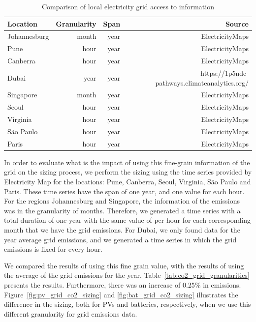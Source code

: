 \begin{table}[H]

  \caption{Comparison of local electricity grid access to information }\label{tab:grid_emissions_hist} \centering
  
  \begin{tabular}{|l|r|r|r|}
   \hline
    
  \textbf{Location} &   \textbf{Granularity} & \textbf{Span} & \textbf{Source} \\
  \hline
  Johannesburg & month & year & ElectricityMaps  \\
  \hline
  Pune  & hour & year & ElectricityMaps  \\
  \hline
  Canberra  & hour &  year & ElectricityMaps \\
  \hline
  Dubai    & year & year & https://1p5ndc-pathways.climateanalytics.org/  \\
  \hline
  Singapore & month & year & ElectricityMaps \\
  \hline     
  Seoul     & hour & year & ElectricityMaps \\
  \hline
  Virginia  &  hour & year & ElectricityMaps \\
  \hline
  São Paulo & hour & year  & ElectricityMaps \\
  \hline 
  Paris     & hour & year  & ElectricityMaps  \\  
  \hline  

\end{tabular}  
\end{table}


In order to evaluate what is the impact of using this fine-grain information of the grid  on the sizing process, we perform the sizing using the time series provided by Electricity Map for the locations: Pune, Canberra, Seoul, Virginia, São Paulo and Paris. These time series have the span of one year, and one value for each hour. For the regions Johannesburg and Singapore, the information of the  emissions was in the granularity of months. Therefore, we generated a time series with a total duration of one year with the same value of  per hour for each corresponding month that we have the grid  emissions. For Dubai, we only found data for the year average grid  emissions, and we generated a time series in which the grid emissions is fixed for every hour.


We compared the results of using this fine grain value, with the results of using the average of the grid emissions for the year. Table~\ref{tab:co2_grid_granularities} presents the results. Furthermore, there was an increase of 0.25\% in  emissions. Figure~\ref{fig:pv_grid_co2_sizing} and \ref{fig:bat_grid_co2_sizing} illustrates the difference in the sizing, both for PVs and batteries, respectively, when we use this different granularity for grid  emissions data.



